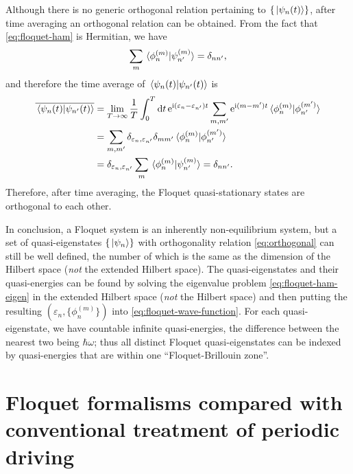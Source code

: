 \documentclass[hyperref, a4paper]{article}
\newcommand*{\ii}{\mathrm{i}}
\newcommand*{\ee}{\mathrm{e}}
\begin{document}
Although there is no generic orthogonal relation pertaining to $\{\ket*{\psi_n(t)}\}$,
after time averaging an orthogonal relation can be obtained.
From the fact that \eqref{eq:floquet-ham} is Hermitian, we have 
\begin{equation}
    \sum_m \braket*{\phi_n^{(m)}}{\psi_{n'}^{(m)}} = \delta_{nn'},
\end{equation}
and therefore the time average of $\braket*{\psi_n(t)}{\psi_{n'}(t)}$ is 
\begin{equation}
    \begin{aligned}
        \overline{\braket*{\psi_n(t)}{\psi_{n'}(t)}} &= 
        \lim_{T \to \infty} \frac{1}{T} \int_{0}^{T} \dd{t} 
        \ee^{\ii (\varepsilon_n - \varepsilon_{n'}) t}
        \sum_{m, m'}  \ee^{\ii (m - m') t}
        \braket*{\phi_n^{(m)}}{\phi_{n'}^{(m')}} \\
        &= \sum_{m, m'} \delta_{\varepsilon_n, \varepsilon_{n'}}
        \delta_{mm'} \braket*{\phi_n^{(m)}}{\phi_{n'}^{(m')}}  \\
        &= \delta_{\varepsilon_n, \varepsilon_{n'}} \sum_{m} \braket*{\phi_n^{(m)}}{\psi_{n'}^{(m)}}
        = \delta_{nn'}.
    \end{aligned}
    \label{eq:orthogonal}
\end{equation}
Therefore, after time averaging, the Floquet quasi-stationary states 
are orthogonal to each other.

In conclusion, a Floquet system is an inherently non-equilibrium system,
but a set of quasi-eigenstates $\{ \ket*{\psi_n} \}$
with orthogonality relation \eqref{eq:orthogonal} can still be well defined,
the number of which is the same as 
the dimension of the Hilbert space 
(\emph{not} the extended Hilbert space).
The quasi-eigenstates and their quasi-energies can be found by solving 
the eigenvalue problem \eqref{eq:floquet-ham-eigen} in the extended Hilbert space
(\emph{not} the Hilbert space) 
and then putting the resulting $(\varepsilon_n, \{\phi_n^{(m)}\})$
into \eqref{eq:floquet-wave-function}.
For each quasi-eigenstate,
we have countable infinite quasi-energies,
the difference between the nearest two being $\hbar \omega$;
thus all distinct Floquet quasi-eigenstates can be indexed 
by quasi-energies that are within one ``Floquet-Brillouin zone''.

\section{Floquet formalisms compared with conventional treatment of periodic driving}
\end{document}
